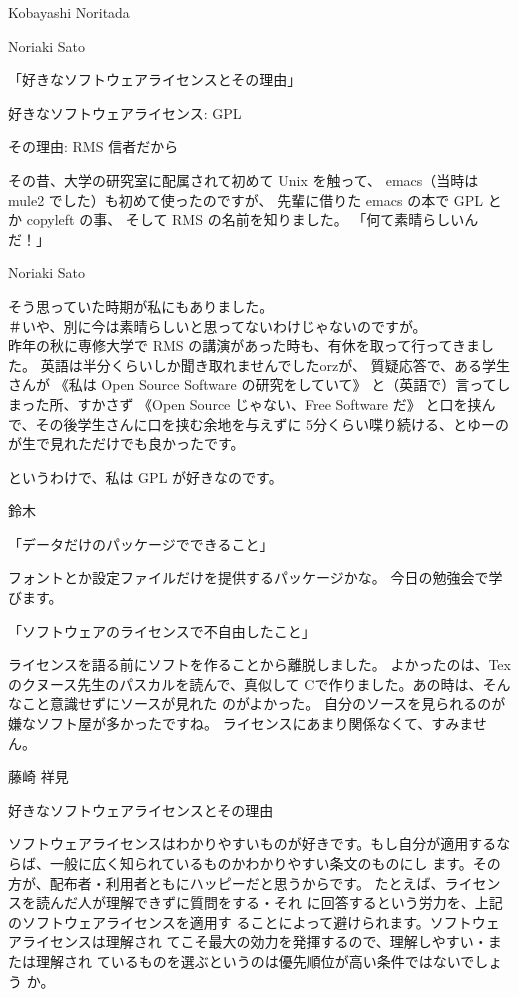 \documentclass[cjk,dvipdfmx,12pt]{beamer}
\begin{document}
\begin{frame}{Kobayashi Noritada}
\end{frame}\begin{frame}{Noriaki Sato}


「好きなソフトウェアライセンスとその理由」

好きなソフトウェアライセンス: GPL

その理由: RMS 信者だから

その昔、大学の研究室に配属されて初めて Unix を触って、
emacs（当時は mule2 でした）も初めて使ったのですが、
先輩に借りた emacs の本で GPL とか copyleft の事、
そして RMS の名前を知りました。
「何て素晴らしいんだ！」

\end{frame}\begin{frame}{Noriaki Sato}

そう思っていた時期が私にもありました。\\
＃いや、別に今は素晴らしいと思ってないわけじゃないのですが。\\
昨年の秋に専修大学で RMS の講演があった時も、有休を取って行ってきました。
英語は半分くらいしか聞き取れませんでしたorzが、
質疑応答で、ある学生さんが
《私は Open Source Software の研究をしていて》
と（英語で）言ってしまった所、すかさず
《Open Source じゃない、Free Software だ》
と口を挟んで、その後学生さんに口を挟む余地を与えずに
5分くらい喋り続ける、とゆーのが生で見れただけでも良かったです。

というわけで、私は GPL が好きなのです。


\end{frame}\begin{frame}{鈴木}

「データだけのパッケージでできること」

フォントとか設定ファイルだけを提供するパッケージかな。
今日の勉強会で学びます。

「ソフトウェアのライセンスで不自由したこと」

ライセンスを語る前にソフトを作ることから離脱しました。
よかったのは、Texのクヌース先生のパスカルを読んで、真似して
Cで作りました。あの時は、そんなこと意識せずにソースが見れた
のがよかった。
自分のソースを見られるのが嫌なソフト屋が多かったですね。
ライセンスにあまり関係なくて、すみません。

\end{frame}\begin{frame}{藤崎 祥見}


好きなソフトウェアライセンスとその理由

ソフトウェアライセンスはわかりやすいものが好きです。もし自分が適用するな
	    らば、一般に広く知られているものかわかりやすい条文のものにし
	    ます。その方が、配布者・利用者ともにハッピーだと思うからです。
	    たとえば、ライセンスを読んだ人が理解できずに質問をする・それ
	    に回答するという労力を、上記のソフトウェアライセンスを適用す
	    ることによって避けられます。ソフトウェアライセンスは理解され
	    てこそ最大の効力を発揮するので、理解しやすい・または理解され
	    ているものを選ぶというのは優先順位が高い条件ではないでしょう
	    か。


\end{frame}
\end{document}
